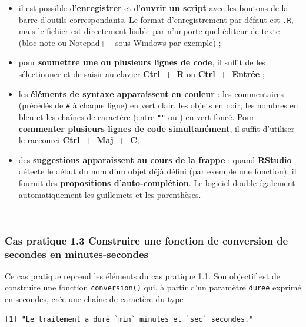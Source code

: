\documentclass[12pt,twosided, notitlepage]{book}
\providecommand{\tightlist}{%
  \setlength{\itemsep}{0pt}\setlength{\parskip}{0pt}}
\begin{document}
\begin{itemize}
\tightlist
\item
  il est possible d'\textbf{enregistrer} et d'\textbf{ouvrir un script}
  avec les boutons de la barre d'outils correspondants. Le format
  d'enregistrement par défaut est \texttt{.R}, mais le fichier est
  directement lisible par n'importe quel éditeur de texte (bloc-note ou
  Notepad++ sous Windows par exemple) ;
\item
  pour \textbf{soumettre une ou plusieurs lignes de code}, il suffit de
  les sélectionner et de saisir au clavier \textbf{Ctrl~+~R} ou
  \textbf{Ctrl~+~Entrée} ;
\item
  les \textbf{éléments de syntaxe apparaissent en couleur} : les
  commentaires (précédés de \texttt{\#} à chaque ligne) en vert clair,
  les objets en noir, les nombres en bleu et les chaînes de caractère
  (entre \texttt{""} ou \texttt{\textquotesingle{}\textquotesingle{}})
  en vert foncé. Pour \textbf{commenter plusieurs lignes de code
  simultanément}, il suffit d'utiliser le raccourci
  \textbf{Ctrl~+~Maj~+~C};
\item
  des \textbf{suggestions apparaissent au cours de la frappe} : quand
  \textbf{RStudio} détecte le début du nom d'un objet déjà défini (par
  exemple une fonction), il fournit des \textbf{propositions
  d'auto-complétion}. Le logiciel double également automatiquement les
  guillemets et les parenthèses.
\end{itemize}

~

\subsubsection{\texorpdfstring{\textbf{Cas pratique 1.3} Construire une
fonction de conversion de secondes en
minutes-secondes}{Cas pratique 1.3 Construire une fonction de conversion de secondes en minutes-secondes}}\label{cas-pratique-1.3-construire-une-fonction-de-conversion-de-secondes-en-minutes-secondes}

Ce cas pratique reprend les éléments du cas pratique 1.1. Son objectif
est de construire une fonction \texttt{conversion()} qui, à partir d'un
paramètre \texttt{duree} exprimé en secondes, crée une chaîne de
caractère du type

\begin{verbatim}
[1] "Le traitement a duré `min` minutes et `sec` secondes."
\end{verbatim}
\end{document}
